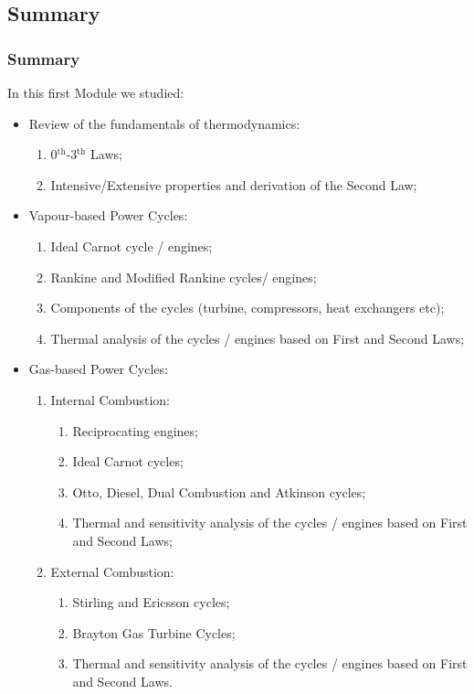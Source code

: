 \documentclass[10pt,compress]{beamer}
\begin{document}
\subsection{Summary}
\begin{frame}
 \frametitle{Summary}
  In this first Module we studied:
  \begin{itemize}
   \item <1-> Review of the fundamentals of thermodynamics:
    \begin{enumerate}
     \item <2-> 0$^{\text{th}}$-3$^{\text{th}}$ Laws;
     \item <3-> Intensive/Extensive properties and derivation of the Second Law;
    \end{enumerate}

   \item <4-> Vapour-based Power Cycles:
    \begin{enumerate}
     \item <5-> Ideal Carnot cycle / engines;
     \item <6-> Rankine and Modified Rankine cycles/ engines;
     \item <7-> Components of the cycles (turbine, compressors, heat exchangers etc);
     \item <8-> Thermal analysis of the cycles / engines based on First and Second Laws;
    \end{enumerate}

   \item <9-> Gas-based Power Cycles:
    \begin{enumerate}
     \item <10-> Internal Combustion:
      \begin{enumerate}
       \item <12-> Reciprocating engines;
       \item <13-> Ideal Carnot cycles;
       \item <14-> Otto, Diesel, Dual Combustion and Atkinson cycles;
       \item <15-> Thermal and sensitivity analysis of the cycles / engines based on First and Second Laws;
      \end{enumerate}
     \item <11-> External Combustion:
        \begin{enumerate}
         \item <16-> Stirling and Ericsson cycles;
         \item <17-> Brayton Gas Turbine Cycles;
         \item <18-> Thermal and sensitivity analysis of the cycles / engines based on First and Second Laws.
        \end{enumerate}
    \end{enumerate}      

  \end{itemize}

\end{frame}
\end{document}
